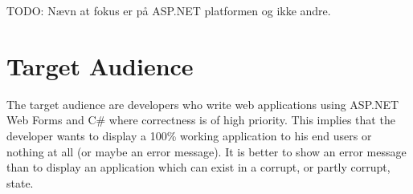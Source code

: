 		TODO: Nævn at fokus er på ASP.NET platformen og ikke andre.

\section{Target Audience}
	The target audience are developers who write web applications using ASP.NET Web Forms and C\# where correctness is of high priority. This implies that the developer wants to display a 100\% working application to his end users or nothing at all (or maybe an error message). It is better to show an error message than to display an application which can exist in a corrupt, or partly corrupt, state.





